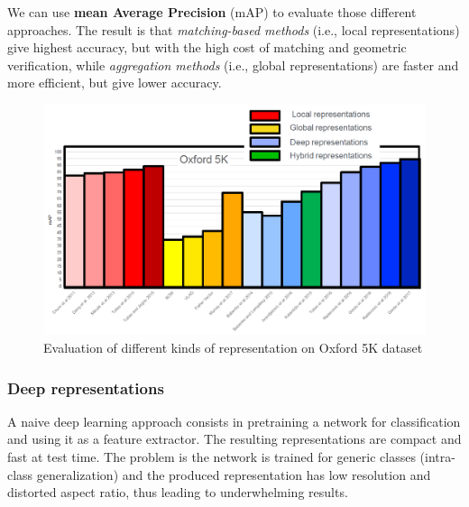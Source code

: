 We can use \textbf{mean Average Precision} (mAP) to evaluate those different approaches. The result is that \textit{matching-based methods} (i.e., local representations) give highest accuracy, but with the high cost of matching and geometric verification, while \textit{aggregation methods} (i.e., global representations) are faster and more efficient, but give lower accuracy.

\begin{figure}[h!]
    \centering
    \includegraphics[width=0.9\linewidth]{images/oxford-map}
    \caption[Evaluation of different kinds of representation on Oxford 5K dataset]{Evaluation of different kinds of representation on Oxford 5K dataset}
    \label{fig:oxford-map}
\end{figure}


\subsubsection{Deep representations}\label{sec:vs-deep}

A naive deep learning approach consists in pretraining a network for classification and using it as a feature extractor. The resulting representations are compact and fast at test time. The problem is the network is trained for generic classes (intra-class generalization) and the produced representation has low resolution and distorted aspect ratio, thus leading to underwhelming results.

